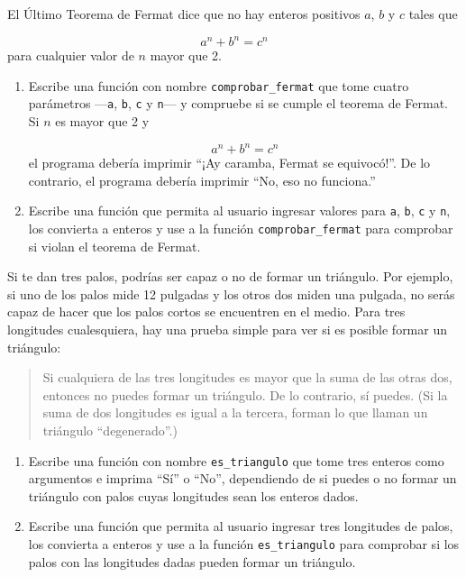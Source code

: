 \documentclass[10pt]{book}
\begin{document}
\begin{exercise}

El Último Teorema de Fermat dice que no hay enteros positivos
$a$, $b$ y $c$ tales que

\[ a^n + b^n = c^n \]
%
para cualquier valor de $n$ mayor que 2.

\begin{enumerate}

\item Escribe una función con nombre \verb"comprobar_fermat" que tome cuatro
parámetros ---{\tt a}, {\tt b}, {\tt c} y {\tt n}--- y
compruebe si se cumple el teorema de Fermat.  Si
$n$ es mayor que 2 y

\[a^n + b^n = c^n \]
%
el programa debería imprimir ``¡Ay caramba, Fermat se equivocó!''.
De lo contrario, el programa debería imprimir ``No, eso no funciona.''

\item Escribe una función que permita al usuario ingresar valores
para {\tt a}, {\tt b}, {\tt c} y {\tt n}, los convierta a
enteros y use a la función \verb"comprobar_fermat" para comprobar si
violan el teorema de Fermat.

\end{enumerate}

\end{exercise}


\begin{exercise}

Si te dan tres palos, podrías ser capaz o no de formar
un triángulo.  Por ejemplo, si uno de los palos mide 12 pulgadas
y los otros dos miden una pulgada, no serás
capaz de hacer que los palos cortos se encuentren en el medio.  Para tres
longitudes cualesquiera, hay una prueba simple para ver si es posible formar
un triángulo:

\begin{quotation}
Si cualquiera de las tres longitudes es mayor que la suma de las otras
  dos, entonces no puedes formar un triángulo.  De lo contrario, sí
  puedes.  (Si la suma de dos longitudes es igual a la tercera, forman
    lo que llaman un triángulo ``degenerado''.)
\end{quotation}

\begin{enumerate}

\item Escribe una función con nombre \verb"es_triangulo" que tome tres
  enteros como argumentos e imprima ``Sí'' o ``No'', dependiendo
  de si puedes o no formar un triángulo con palos cuyas longitudes sean
  los enteros dados.

\item Escribe una función que permita al usuario ingresar tres longitudes de
  palos, los convierta a enteros y use a la función \verb"es_triangulo" para
  comprobar si los palos con las longitudes dadas pueden formar un triángulo.

\end{enumerate}

\end{exercise}
\end{document}
